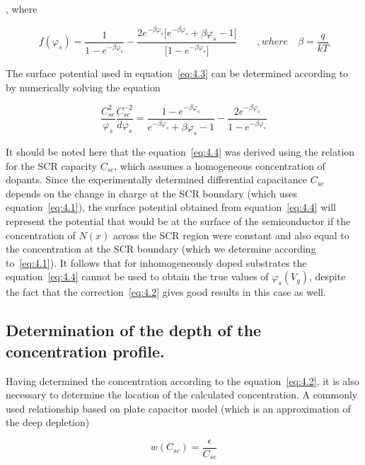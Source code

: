 , where

\begin{equation}\label{eq:4.3}
  f(\varphi_{s}) = {\frac{1}{1-e^{-\beta\varphi_{s}}}} - {\frac{2e^{-\beta\varphi_{s}}\big[e^{-\beta\varphi_{s}}+\beta\varphi_{s} -1\big]}{\big[1-e^{-\beta\varphi_{s}}\big]}} \qquad, where\quad \beta=\frac{q}{kT}
\end{equation}

The surface potential used in equation~\ref{eq:4.3} can be determined
according to~\cite{4.7} by numerically solving the equation

\begin{equation}\label{eq:4.4}
  \frac{C_{sc}^{2}}{\varphi_{s}}\frac{C_{sc}^{-2}}{d\varphi_{s}}=\frac{1-e^{-\beta\varphi_{s}}}{e^{-\beta\varphi_{s}}+\beta\varphi_{s}-1}-\frac{2e^{-\beta\varphi_{s}}} {1-e^{-\beta\varphi_{s}}}
\end{equation}

It should be noted here that the equation~\ref{eq:4.4} was derived
using the relation for the SCR capacity $C_{sc}$, which assumes a
homogeneous concentration of dopants. Since the experimentally
determined differential capacitance $C_{sc}$ depends on the change in
charge at the SCR boundary (which uses equation~\ref{eq:4.1}), the
surface potential obtained from equation~\ref{eq:4.4} will represent
the potential that would be at the surface of the semiconductor if the
concentration of $N(x)$ across the SCR region were constant and also
equal to the concentration at the SCR boundary (which we determine
according to~\ref{eq:4.1}). It follows that for inhomogeneously doped
substrates the equation~\ref{eq:4.4} cannot be used to obtain the true
values of $\varphi_{s}(V_{g})$, despite the fact that the
correction~\ref{eq:4.2} gives good results in this case as well.

\subsection[Determination of the depth of the concentration profile.]{Determination of the depth of the concentration profile.}\label{sec:4.1.2}

Having determined the concentration according to the
equation~\ref{eq:4.2}, it is also necessary to determine the location
of the calculated concentration. A commonly used relationship based on
plate capacitor model (which is an approximation of the deep
depletion)

\begin{equation}\label{eq:4.5}
  w(C_{sc})=\frac{\epsilon}{C_{sc}}
\end{equation}

